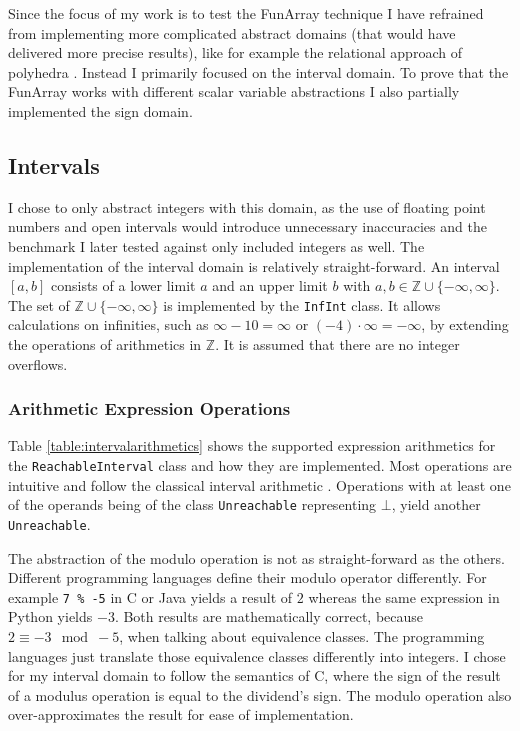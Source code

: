\documentclass{report}
\begin{document}
Since the focus of my work is to test the FunArray technique I have refrained from implementing more complicated abstract domains (that would have delivered more precise results), like for example the relational approach of polyhedra \cite{cousot1978}. Instead I primarily focused on the interval domain. To prove that the FunArray works with different scalar variable abstractions I also partially implemented the sign domain.

\subsection{Intervals}

I chose to only abstract integers with this domain, as the use of floating point numbers and open intervals would introduce unnecessary inaccuracies and the benchmark I later tested against only included integers as well. The implementation of the interval domain is relatively straight-forward. An interval $[a,b]$ consists of a lower limit $a$ and an upper limit $b$ with $a,b \in \mathbb{Z}\cup\{-\infty,\infty\}$. The set of $\mathbb{Z}\cup\{-\infty,\infty\}$ is implemented by the \texttt{InfInt} class. It allows calculations on infinities, such as $\infty - 10 = \infty$ or $(-4) \cdot \infty = -\infty$, by extending the operations of arithmetics in $\mathbb{Z}$. It is assumed that there are no integer overflows.


\subsubsection{Arithmetic Expression Operations}

Table \ref{table:intervalarithmetics} shows the supported expression arithmetics for the \texttt{ReachableInterval} class and how they are implemented. Most operations are intuitive and follow the classical interval arithmetic \cite{dawood2011}. Operations with at least one of the operands being of the class \texttt{Unreachable} representing $\bot$, yield another \texttt{Unreachable}. 

The abstraction of the modulo operation is not as straight-forward as the others. Different programming languages define their modulo operator differently. For example \texttt{7 \% -5} in C or Java yields a result of $2$ whereas the same expression in Python yields $-3$. Both results are mathematically correct, because $2 \equiv -3 \mod -5$, when talking about equivalence classes. The programming languages just translate those equivalence classes differently into integers. I chose for my interval domain to follow the semantics of C, where the sign of the result of a modulus operation is equal to the dividend's sign. The modulo operation also over-approximates the result for ease of implementation.
\end{document}
